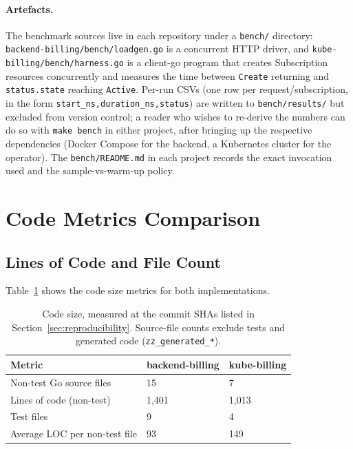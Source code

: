 \paragraph{Artefacts.}
The benchmark sources live in each repository under a \texttt{bench/} directory: \texttt{backend-billing/bench/loadgen.go} is a concurrent HTTP driver, and \texttt{kube-billing/bench/harness.go} is a client-go program that creates Subscription resources concurrently and measures the time between \texttt{Create} returning and \texttt{status.state} reaching \texttt{Active}. Per-run CSVs (one row per request/subscription, in the form \texttt{start\_ns,duration\_ns,status}) are written to \texttt{bench/results/} but excluded from version control; a reader who wishes to re-derive the numbers can do so with \texttt{make bench} in either project, after bringing up the respective dependencies (Docker Compose for the backend, a Kubernetes cluster for the operator). The \texttt{bench/README.md} in each project records the exact invocation used and the sample-vs-warm-up policy.

\section{Code Metrics Comparison}

\subsection{Lines of Code and File Count}

Table~\ref{tab:loc-comparison} shows the code size metrics for both implementations.

\begin{table}[h]
\centering
\caption{Code size, measured at the commit SHAs listed in Section~\ref{sec:reproducibility}. Source-file counts exclude tests and generated code (\texttt{zz\_generated\_*}).}
\label{tab:loc-comparison}
\small\begin{tabularx}{\textwidth}{@{}lXX@{}}
\toprule
\textbf{Metric} & \textbf{backend-billing} & \textbf{kube-billing} \\ \midrule
Non-test Go source files & 15 & 7 \\
Lines of code (non-test) & 1{,}401 & 1{,}013 \\
Test files & 9 & 4 \\
Average LOC per non-test file & 93 & 149 \\ \bottomrule
\end{tabularx}
\end{table}

